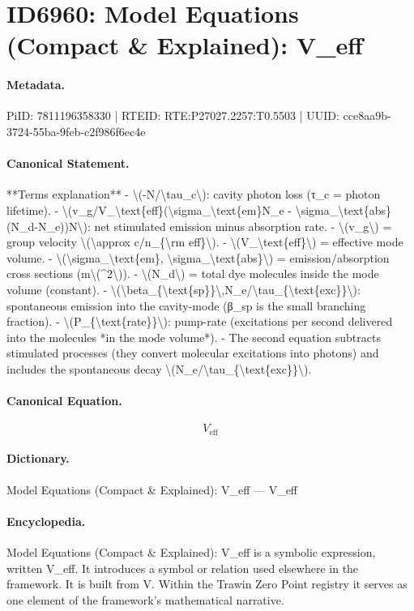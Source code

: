\section*{ID6960: Model Equations (Compact \& Explained): V\_eff}
\paragraph{Metadata.}
PiID: 7811196358330 | RTEID: RTE:P27027.2257:T0.5503 | UUID: cce8aa9b-3724-55ba-9feb-c2f986f6ec4e

\paragraph{Canonical Statement.}
**Terms explanation** - \textbackslash{}(-N/\textbackslash{}tau\_c\textbackslash{}): cavity photon loss (τ\_c = photon lifetime). - \textbackslash{}(v\_g/V\_\textbackslash{}text\{eff\}(\textbackslash{}sigma\_\textbackslash{}text\{em\}N\_e - \textbackslash{}sigma\_\textbackslash{}text\{abs\}(N\_d-N\_e))N\textbackslash{}): net stimulated emission minus absorption rate. - \textbackslash{}(v\_g\textbackslash{}) = group velocity \textbackslash{}(\textbackslash{}approx c/n\_\{\textbackslash{}rm eff\}\textbackslash{}). - \textbackslash{}(V\_\textbackslash{}text\{eff\}\textbackslash{}) = effective mode volume. - \textbackslash{}(\textbackslash{}sigma\_\textbackslash{}text\{em\}, \textbackslash{}sigma\_\textbackslash{}text\{abs\}\textbackslash{}) = emission/absorption cross sections (m\textbackslash{}(\textasciicircum{}2\textbackslash{})). - \textbackslash{}(N\_d\textbackslash{}) = total dye molecules inside the mode volume (constant). - \textbackslash{}(\textbackslash{}beta\_\{\textbackslash{}text\{sp\}\}\textbackslash{},N\_e/\textbackslash{}tau\_\{\textbackslash{}text\{exc\}\}\textbackslash{}): spontaneous emission into the cavity-mode (β\_sp is the small branching fraction). - \textbackslash{}(P\_\{\textbackslash{}text\{rate\}\}\textbackslash{}): pump-rate (excitations per second delivered into the molecules *in the mode volume*). - The second equation subtracts stimulated processes (they convert molecular excitations into photons) and includes the spontaneous decay \textbackslash{}(N\_e/\textbackslash{}tau\_\{\textbackslash{}text\{exc\}\}\textbackslash{}).

\paragraph{Canonical Equation.}
\[
V_\text{eff}
\]

\paragraph{Dictionary.}
Model Equations (Compact \& Explained): V\_eff — V\_eff

\paragraph{Encyclopedia.}
Model Equations (Compact \& Explained): V\_eff is a symbolic expression, written V\_eff. It introduces a symbol or relation used elsewhere in the framework. It is built from V. Within the Trawin Zero Point registry it serves as one element of the framework's mathematical narrative.
